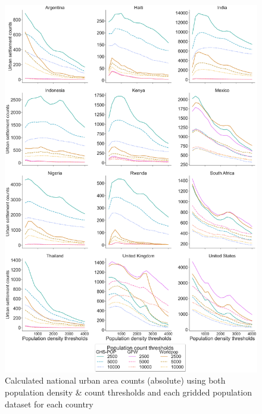 \documentclass[review]{elsarticle}
\begin{document}
	
	\begin{figure}[H]
		\includegraphics[width=\textwidth]{national_urban_area_counts_portrait}
		\caption{Calculated national urban area counts (absolute) using both population density \& count thresholds and each gridded population dataset for each country}
		\label{fig:settlement_relplot}
	\end{figure}
	
	
	\pagebreak
	
\end{document}

